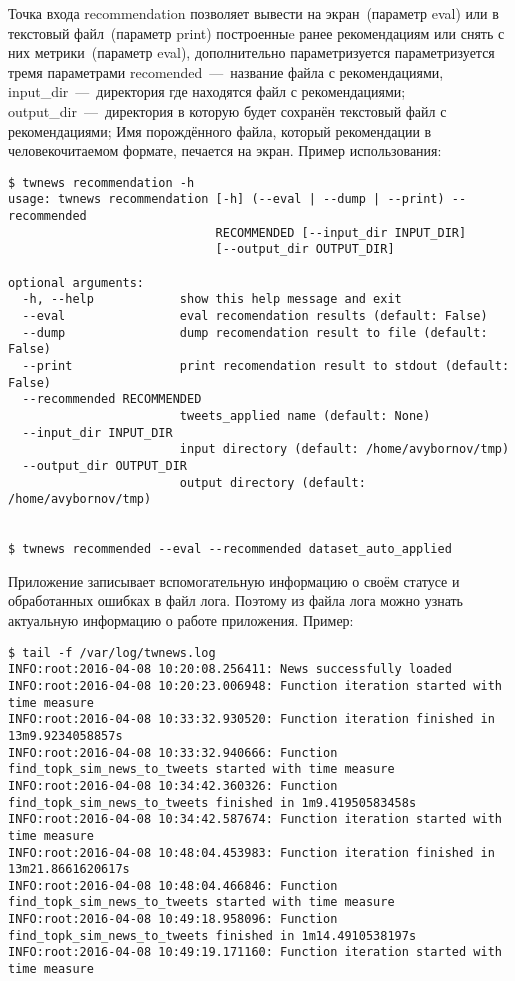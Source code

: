         Точка входа recommendation позволяет вывести на экран~(параметр eval) или в текстовый файл~(параметр print) построенныe ранее рекомендациям или снять с них метрики~(параметр eval),
        дополнительно параметризуется параметризуется тремя параметрами
        recomended~---~название файла с рекомендациями,
        input\_dir~---~директория где находятся файл с рекомендациями;
        output\_dir~---~директория в которую будет сохранён текстовый файл с рекомендациями;
        Имя порождённого файла, который рекомендации в человекочитаемом формате, печается на экран. Пример использования:
        \begin{lstlisting}
$ twnews recommendation -h
usage: twnews recommendation [-h] (--eval | --dump | --print) --recommended
                             RECOMMENDED [--input_dir INPUT_DIR]
                             [--output_dir OUTPUT_DIR]

optional arguments:
  -h, --help            show this help message and exit
  --eval                eval recomendation results (default: False)
  --dump                dump recomendation result to file (default: False)
  --print               print recomendation result to stdout (default: False)
  --recommended RECOMMENDED
                        tweets_applied name (default: None)
  --input_dir INPUT_DIR
                        input directory (default: /home/avybornov/tmp)
  --output_dir OUTPUT_DIR
                        output directory (default: /home/avybornov/tmp)


$ twnews recommended --eval --recommended dataset_auto_applied
        \end{lstlisting}


        Приложение записывает вспомогательную информацию о своём статусе и обработанных ошибках в файл лога.
        Поэтому из файла лога можно узнать актуальную информацию о работе приложения. Пример:
        \begin{lstlisting}
$ tail -f /var/log/twnews.log
INFO:root:2016-04-08 10:20:08.256411: News successfully loaded
INFO:root:2016-04-08 10:20:23.006948: Function iteration started with time measure
INFO:root:2016-04-08 10:33:32.930520: Function iteration finished in 13m9.9234058857s
INFO:root:2016-04-08 10:33:32.940666: Function find_topk_sim_news_to_tweets started with time measure
INFO:root:2016-04-08 10:34:42.360326: Function find_topk_sim_news_to_tweets finished in 1m9.41950583458s
INFO:root:2016-04-08 10:34:42.587674: Function iteration started with time measure
INFO:root:2016-04-08 10:48:04.453983: Function iteration finished in 13m21.8661620617s
INFO:root:2016-04-08 10:48:04.466846: Function find_topk_sim_news_to_tweets started with time measure
INFO:root:2016-04-08 10:49:18.958096: Function find_topk_sim_news_to_tweets finished in 1m14.4910538197s
INFO:root:2016-04-08 10:49:19.171160: Function iteration started with time measure
        \end{lstlisting}